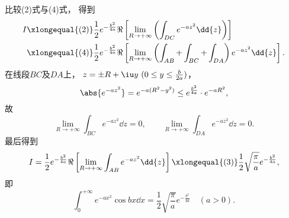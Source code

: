 \begin{example}
\begin{solution}
比较(2)式与(4)式，
得到\begin{align*}
	I &\xlongequal{\rm(2)}
		\frac{1}{2} e^{-\frac{b^2}{4a}}
		\Re\left[
			\lim_{R\to+\infty}
			\left( \int_{DC} e^{-az^2} \dd{z} \right)
		\right] \\
	&\xlongequal{\rm(4)}
		\frac{1}{2} e^{-\frac{b^2}{4a}}
		\Re\left[
			\lim_{R\to+\infty}
			\left( \int_{AB} + \int_{BC} + \int_{DA}\right)
			e^{-az^2} \dd{z}
		\right].
\end{align*}
在线段\(BC\)及\(DA\)上，
\(z=\pm R+\iu y\ (0 \leq y \leq \frac{b}{2a})\)，
\begin{equation*}
	\abs{e^{-az^2}}
	= e^{-a(R^2-y^2)}
	\leq e^{\frac{b^2}{4a}} \cdot e^{-aR^2},
\end{equation*}
故\begin{equation*}
	\lim_{R\to+\infty} \int_{BC} e^{-az^2} \dd{z} = 0,
	\qquad
	\lim_{R\to+\infty} \int_{DA} e^{-az^2} \dd{z} = 0.
\end{equation*}
最后得到\begin{equation*}
	I = \frac{1}{2} e^{-\frac{b^2}{4a}} \Re\left[ \lim_{R\to+\infty} \int_{AB} e^{-az^2} \dd{z} \right]
	\xlongequal{\rm(3)} \frac{1}{2} \sqrt{\frac{\pi}{a}} e^{-\frac{b^2}{4a}},
\end{equation*}
即\begin{equation}\label{equation:留数定理.泊松积分}
	\int_0^{+\infty} e^{-ax^2} \cos bx \dd{x}
	= \frac{1}{2} \sqrt{\frac{\pi}{a}} e^{-\frac{b^2}{4a}}
	\quad(a>0).
\end{equation}
\end{solution}
\end{example}

